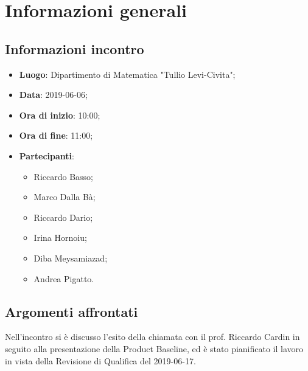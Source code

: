 \section{Informazioni generali}

\subsection{Informazioni incontro}
\begin{itemize}
	\item \textbf{Luogo}: Dipartimento di Matematica "Tullio Levi-Civita";
	\item \textbf{Data}: 2019-06-06;
	\item \textbf{Ora di inizio}: 10:00;
	\item \textbf{Ora di fine}: 11:00;
	\item \textbf{Partecipanti}: 
	\begin{itemize}
		\item Riccardo Basso;
		\item Marco Dalla Bà;
		\item Riccardo Dario;
		\item Irina Hornoiu;
		\item Diba Meysamiazad;
		\item Andrea Pigatto.	
	\end{itemize}
\end{itemize}

\subsection{Argomenti affrontati}
Nell'incontro si è discusso l'esito della chiamata con il prof. Riccardo Cardin in seguito alla presentazione della Product Baseline\glo, ed è stato pianificato il lavoro in vista della Revisione di Qualifica del 2019-06-17.

